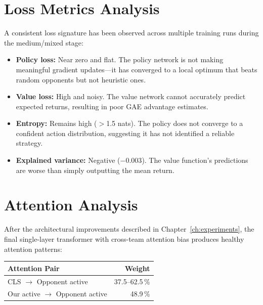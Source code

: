 \section{Loss Metrics Analysis}

A consistent loss signature has been observed across multiple training runs
during the medium/mixed stage:

\begin{itemize}
  \item \textbf{Policy loss:} Near zero and flat.  The policy network is not
        making meaningful gradient updates---it has converged to a local
        optimum that beats random opponents but not heuristic ones.
  \item \textbf{Value loss:} High and noisy.  The value network cannot
        accurately predict expected returns, resulting in poor GAE advantage
        estimates.
  \item \textbf{Entropy:} Remains high ($>$1.5 nats).  The policy does not
        converge to a confident action distribution, suggesting it has not
        identified a reliable strategy.
  \item \textbf{Explained variance:} Negative ($-0.003$).  The value
        function's predictions are worse than simply outputting the mean
        return.
\end{itemize}


\section{Attention Analysis}

After the architectural improvements described in Chapter~\ref{ch:experiments},
the final single-layer transformer with cross-team attention bias produces
healthy attention patterns:

\begin{center}
\small
\begin{tabularx}{0.7\textwidth}{l r}
  \toprule
  \textbf{Attention Pair} & \textbf{Weight} \\
  \midrule
  CLS $\to$ Opponent active     & 37.5--62.5\,\% \\
  Our active $\to$ Opponent active & 48.9\,\% \\
  \bottomrule
\end{tabularx}
\end{center}

